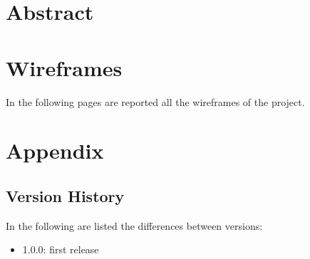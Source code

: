 \documentclass{../Common/Structure/doc_pdf}
\begin{document}
\titleToc

\chapter{Abstract}
\thispagestyle{fancy}

\chapter{Wireframes}
\thispagestyle{fancy}
In the following pages are reported all the wireframes of the project.


\appendix
\chapter{Appendix}
\section{Version History}
In the following are listed the differences between versions:
\begin{itemize}
	\item 1.0.0: first release
\end{itemize}
\end{document}
